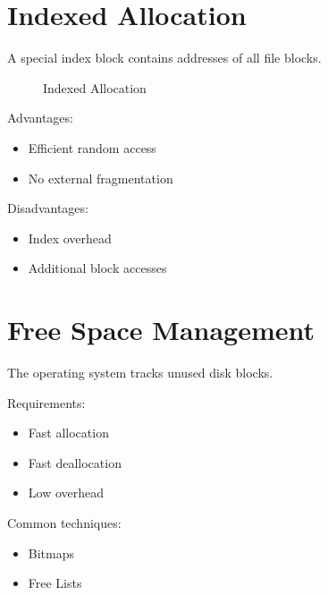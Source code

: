 \section{Indexed Allocation}

A special index block contains addresses of all file blocks.

\begin{figure}[H]
\centering
{}
\caption{Indexed Allocation}
\end{figure}

Advantages:

\begin{itemize}
\item Efficient random access
\item No external fragmentation
\end{itemize}

Disadvantages:

\begin{itemize}
\item Index overhead
\item Additional block accesses
\end{itemize}

\section{Free Space Management}

The operating system tracks unused disk blocks.

Requirements:

\begin{itemize}
\item Fast allocation
\item Fast deallocation
\item Low overhead
\end{itemize}

Common techniques:

\begin{itemize}
\item Bitmaps
\item Free Lists
\end{itemize}

